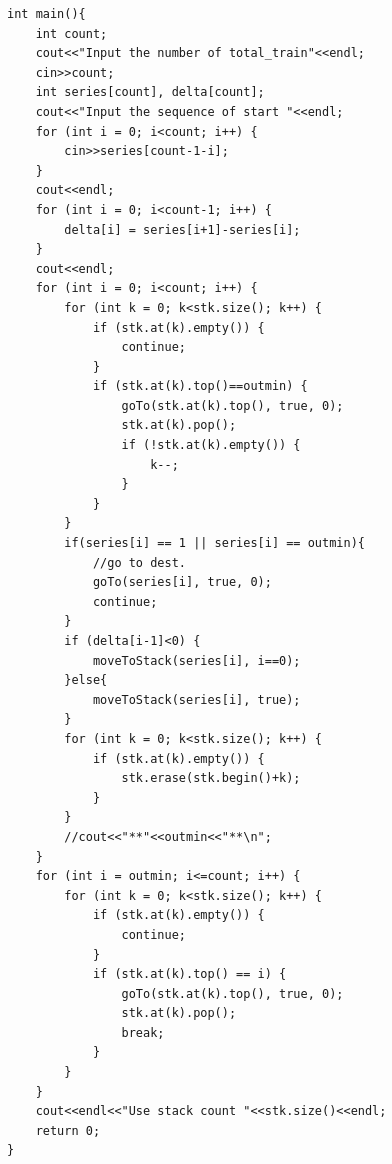 \documentclass[12pt,UTF8]{ctexart}
\begin{document}
\begin{lstlisting}
int main(){
    int count;
    cout<<"Input the number of total_train"<<endl;
    cin>>count;
    int series[count], delta[count];
    cout<<"Input the sequence of start "<<endl;
    for (int i = 0; i<count; i++) {
        cin>>series[count-1-i];
    }
    cout<<endl;
    for (int i = 0; i<count-1; i++) {
        delta[i] = series[i+1]-series[i];
    }
    cout<<endl;
    for (int i = 0; i<count; i++) {
        for (int k = 0; k<stk.size(); k++) {
            if (stk.at(k).empty()) {
                continue;
            }
            if (stk.at(k).top()==outmin) {
                goTo(stk.at(k).top(), true, 0);
                stk.at(k).pop();
                if (!stk.at(k).empty()) {
                    k--;
                }
            }
        }
        if(series[i] == 1 || series[i] == outmin){
            //go to dest.
            goTo(series[i], true, 0);
            continue;
        }
        if (delta[i-1]<0) {
            moveToStack(series[i], i==0);
        }else{
            moveToStack(series[i], true);
        }
        for (int k = 0; k<stk.size(); k++) {
            if (stk.at(k).empty()) {
                stk.erase(stk.begin()+k);
            }
        }
        //cout<<"**"<<outmin<<"**\n";
    }
    for (int i = outmin; i<=count; i++) {
        for (int k = 0; k<stk.size(); k++) {
            if (stk.at(k).empty()) {
                continue;
            }
            if (stk.at(k).top() == i) {
                goTo(stk.at(k).top(), true, 0);
                stk.at(k).pop();
                break;
            }
        }
    }
    cout<<endl<<"Use stack count "<<stk.size()<<endl;
    return 0;
}


\end{lstlisting}
\end{document}
